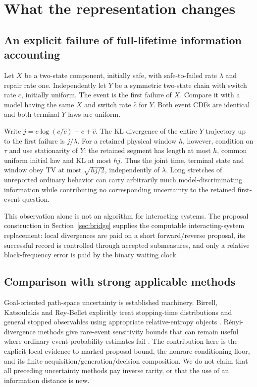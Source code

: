 \section{What the representation changes}
\subsection{An explicit failure of full-lifetime information accounting}
Let $X$ be a two-state component, initially safe, with safe-to-failed
rate $\lambda$ and repair rate one. Independently let $Y$ be a symmetric
two-state chain with switch rate $c$, initially uniform. The event is the
first failure of $X$. Compare it with a model having the same $X$ and
switch rate $\widehat c$ for $Y$. Both event CDFs are identical and both
terminal $Y$ laws are uniform.

Write $j=c\log(c/\widehat c)-c+\widehat c$. The KL divergence of the
entire $Y$ trajectory up to the first failure is $j/\lambda$.
For a retained physical window $h$, however, condition on $\tau$ and
use stationarity of $Y$: the retained segment has length at most $h$,
common uniform initial law and KL at most $hj$. Thus the joint time,
terminal state and window obey TV at most $\sqrt{hj/2}$, independently
of $\lambda$. Long stretches of unreported ordinary behavior can carry
arbitrarily much model-discriminating information while contributing no
corresponding uncertainty to the retained first-event question.

This observation alone is not an algorithm for interacting systems.
The proposal construction in Section~\ref{sec:bridge} supplies the
computable interacting-system replacement: local divergences are paid
on a short forward/reverse proposal, its successful record is controlled
through accepted submeasures, and only a relative block-frequency error
is paid by the binary waiting clock.

\subsection{Comparison with strong applicable methods}
Goal-oriented path-space uncertainty is established machinery.
Birrell, Katsoulakis and Rey-Bellet explicitly treat stopping-time
distributions and general stopped observables using appropriate
relative-entropy objects \cite{birrell}. R\'enyi-divergence methods
give rare-event sensitivity bounds that can remain useful where ordinary
event-probability estimates fail \cite{renyi}. The contribution here is
the explicit local-evidence-to-marked-proposal bound, the nonrare
conditioning floor, and its finite acquisition/generation/decision
composition. We do not claim that all preceding uncertainty methods pay
inverse rarity, or that the use of an information distance is new.

